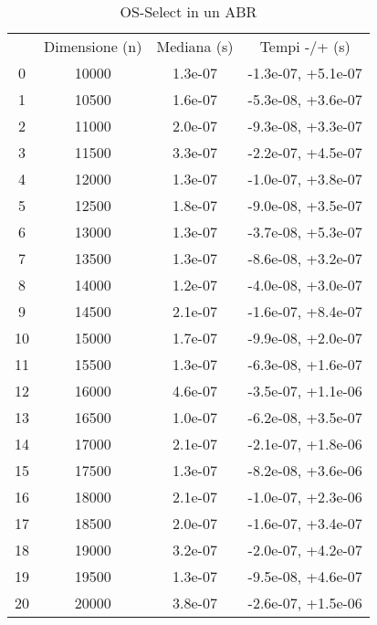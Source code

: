 \begin{table}
\centering
\caption{OS-Select in un ABR}
\label{OS-Select in un ABR}
\begin{adjustbox}{width=1\textwidth/2}
\begin{tabular}{|c|c|c|c|}
\hline
 & Dimensione (n) & Mediana (s) & Tempi -/+ (s) \\
0 & 10000 & 1.3e-07 & -1.3e-07, +5.1e-07 \\
\cline{1-4}
1 & 10500 & 1.6e-07 & -5.3e-08, +3.6e-07 \\
\cline{1-4}
2 & 11000 & 2.0e-07 & -9.3e-08, +3.3e-07 \\
\cline{1-4}
3 & 11500 & 3.3e-07 & -2.2e-07, +4.5e-07 \\
\cline{1-4}
4 & 12000 & 1.3e-07 & -1.0e-07, +3.8e-07 \\
\cline{1-4}
5 & 12500 & 1.8e-07 & -9.0e-08, +3.5e-07 \\
\cline{1-4}
6 & 13000 & 1.3e-07 & -3.7e-08, +5.3e-07 \\
\cline{1-4}
7 & 13500 & 1.3e-07 & -8.6e-08, +3.2e-07 \\
\cline{1-4}
8 & 14000 & 1.2e-07 & -4.0e-08, +3.0e-07 \\
\cline{1-4}
9 & 14500 & 2.1e-07 & -1.6e-07, +8.4e-07 \\
\cline{1-4}
10 & 15000 & 1.7e-07 & -9.9e-08, +2.0e-07 \\
\cline{1-4}
11 & 15500 & 1.3e-07 & -6.3e-08, +1.6e-07 \\
\cline{1-4}
12 & 16000 & 4.6e-07 & -3.5e-07, +1.1e-06 \\
\cline{1-4}
13 & 16500 & 1.0e-07 & -6.2e-08, +3.5e-07 \\
\cline{1-4}
14 & 17000 & 2.1e-07 & -2.1e-07, +1.8e-06 \\
\cline{1-4}
15 & 17500 & 1.3e-07 & -8.2e-08, +3.6e-06 \\
\cline{1-4}
16 & 18000 & 2.1e-07 & -1.0e-07, +2.3e-06 \\
\cline{1-4}
17 & 18500 & 2.0e-07 & -1.6e-07, +3.4e-07 \\
\cline{1-4}
18 & 19000 & 3.2e-07 & -2.0e-07, +4.2e-07 \\
\cline{1-4}
19 & 19500 & 1.3e-07 & -9.5e-08, +4.6e-07 \\
\cline{1-4}
20 & 20000 & 3.8e-07 & -2.6e-07, +1.5e-06 \\
\cline{1-4}
\end{tabular}
\end{adjustbox}
\end{table}


